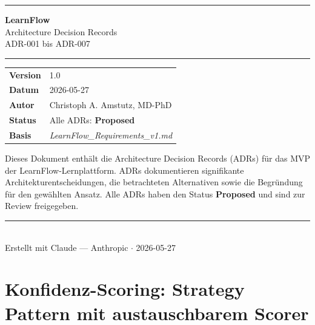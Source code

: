 \documentclass[a4paper, 11pt, oneside]{report}
\newcommand{\statusProposed}{%
  \colorbox{statusproposed!28}{\small\bfseries\color{statusproposed!70!black}\;Proposed\;}}
\begin{document}

\begin{titlepage}
\centering
\vspace*{2.5cm}
{\color{adrblue}\rule{\linewidth}{2pt}}
\vspace{0.9cm}

{\Huge\bfseries\sffamily\color{adrblue} LearnFlow}\\[0.4cm]
{\LARGE\sffamily Architecture Decision Records}\\[0.25cm]
{\large ADR-001 bis ADR-007}

\vspace{0.8cm}
{\color{adrblue}\rule{\linewidth}{0.5pt}}
\vspace{0.8cm}

\begin{tabular}{@{}ll@{}}
\textbf{Version}  & 1.0 \\[4pt]
\textbf{Datum}    & 2026-05-27 \\[4pt]
\textbf{Autor}    & Christoph A. Amstutz, MD-PhD \\[4pt]
\textbf{Status}   & Alle ADRs: \statusProposed \\[4pt]
\textbf{Basis}    & \textit{LearnFlow\_Requirements\_v1.md} \\
\end{tabular}

\vspace{1.6cm}
\begin{tcolorbox}[
  enhanced, colback=adrlightblue, colframe=adrblue,
  boxrule=1pt, arc=4pt, width=0.85\linewidth]
\small Dieses Dokument enthält die Architecture Decision Records (ADRs)
für das MVP der LearnFlow-Lernplattform.
ADRs dokumentieren signifikante Architekturentscheidungen,
die betrachteten Alternativen sowie die Begründung für den gewählten Ansatz.
Alle ADRs haben den Status \textbf{Proposed} und sind zur Review freigegeben.
\end{tcolorbox}

\vfill
{\color{adrblue!40}\rule{\linewidth}{0.5pt}}\\[4pt]
{\small\color{gray!65} Erstellt mit Claude --- Anthropic $\cdot$ 2026-05-27}
\end{titlepage}

\tableofcontents
\clearpage

\chapter{Konfidenz-Scoring: Strategy Pattern mit austauschbarem Scorer}
\label{chap:adr001}
\end{document}
